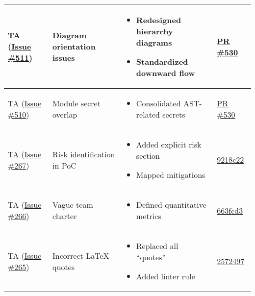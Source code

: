 \documentclass{article}
\begin{document}
\begin{longtable}{|p{2cm}|p{3.5cm}|p{4.5cm}|p{3cm}|}
    TA (\href{https://github.com/ssm-lab/capstone--source-code-optimizer/issues/511}{Issue \#511}) & 
    Diagram orientation issues &
    \begin{itemize}[nosep,leftmargin=*]
        \item Redesigned hierarchy diagrams
        \item Standardized downward flow
    \end{itemize} &
    \href{https://github.com/ssm-lab/capstone--source-code-optimizer/issues/530}{PR \#530} \\
    \hline
    
    TA (\href{https://github.com/ssm-lab/capstone--source-code-optimizer/issues/510}{Issue \#510}) & 
    Module secret overlap &
    \begin{itemize}[nosep,leftmargin=*]
        \item Consolidated AST-related secrets
    \end{itemize} &
    \href{https://github.com/ssm-lab/capstone--source-code-optimizer/issues/530}{PR \#530} \\
    \hline
    
    TA (\href{https://github.com/ssm-lab/capstone--source-code-optimizer/issues/267}{Issue \#267}) & 
    Risk identification in PoC &
    \begin{itemize}[nosep,leftmargin=*]
        \item Added explicit risk section
        \item Mapped mitigations
    \end{itemize} &
    \href{https://github.com/ssm-lab/capstone--source-code-optimizer/commit/9218c22}{9218c22} \\
    \hline
    
    TA (\href{https://github.com/ssm-lab/capstone--source-code-optimizer/issues/266}{Issue \#266}) & 
    Vague team charter &
    \begin{itemize}[nosep,leftmargin=*]
        \item Defined quantitative metrics
    \end{itemize} &
    \href{https://github.com/ssm-lab/capstone--source-code-optimizer/commit/663fcd3}{663fcd3} \\
    \hline
    
    TA (\href{https://github.com/ssm-lab/capstone--source-code-optimizer/issues/265}{Issue \#265}) & 
    Incorrect LaTeX quotes &
    \begin{itemize}[nosep,leftmargin=*]
        \item Replaced all ``quotes''
        \item Added linter rule
    \end{itemize} &
    \href{https://github.com/ssm-lab/capstone--source-code-optimizer/commit/2572497}{2572497} \\
    \hline
    

\end{longtable}
\end{document}
